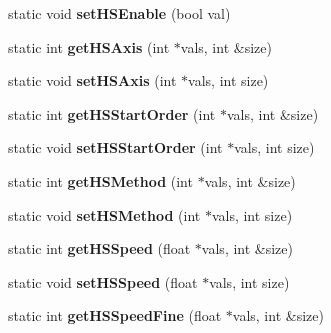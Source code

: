 \begin{DoxyCompactItemize}
\item 
\hypertarget{classRobotConf_ae16df07413f8d3f9a3ea113a5ac3779e}{static void {\bfseries set\-H\-S\-Enable} (bool val)}\label{classRobotConf_ae16df07413f8d3f9a3ea113a5ac3779e}

\item 
\hypertarget{classRobotConf_afbb83ea7dfe9112db13c45d89dfba76b}{static int {\bfseries get\-H\-S\-Axis} (int $\ast$vals, int \&size)}\label{classRobotConf_afbb83ea7dfe9112db13c45d89dfba76b}

\item 
\hypertarget{classRobotConf_a478d5c69ee76d2287c4e18d04b5d37a5}{static void {\bfseries set\-H\-S\-Axis} (int $\ast$vals, int size)}\label{classRobotConf_a478d5c69ee76d2287c4e18d04b5d37a5}

\item 
\hypertarget{classRobotConf_a44eac32a6cdd5db7d56948d09edda8a5}{static int {\bfseries get\-H\-S\-Start\-Order} (int $\ast$vals, int \&size)}\label{classRobotConf_a44eac32a6cdd5db7d56948d09edda8a5}

\item 
\hypertarget{classRobotConf_a679eaf8b04b6f6d3589371cc539e4928}{static void {\bfseries set\-H\-S\-Start\-Order} (int $\ast$vals, int size)}\label{classRobotConf_a679eaf8b04b6f6d3589371cc539e4928}

\item 
\hypertarget{classRobotConf_a5641673b2eb1a3b2b3eb7d41eec0ebdc}{static int {\bfseries get\-H\-S\-Method} (int $\ast$vals, int \&size)}\label{classRobotConf_a5641673b2eb1a3b2b3eb7d41eec0ebdc}

\item 
\hypertarget{classRobotConf_ae3d9ff5ed8a3c5f9d50b0198217e9c11}{static void {\bfseries set\-H\-S\-Method} (int $\ast$vals, int size)}\label{classRobotConf_ae3d9ff5ed8a3c5f9d50b0198217e9c11}

\item 
\hypertarget{classRobotConf_ae906f293254cec68863af7435ba211bb}{static int {\bfseries get\-H\-S\-Speed} (float $\ast$vals, int \&size)}\label{classRobotConf_ae906f293254cec68863af7435ba211bb}

\item 
\hypertarget{classRobotConf_afad4e0c92ba92da8951026343ebbd622}{static void {\bfseries set\-H\-S\-Speed} (float $\ast$vals, int size)}\label{classRobotConf_afad4e0c92ba92da8951026343ebbd622}

\item 
\hypertarget{classRobotConf_a1fc76b704cf94481c49e1b832bb4e5df}{static int {\bfseries get\-H\-S\-Speed\-Fine} (float $\ast$vals, int \&size)}\label{classRobotConf_a1fc76b704cf94481c49e1b832bb4e5df}


\end{DoxyCompactItemize}
